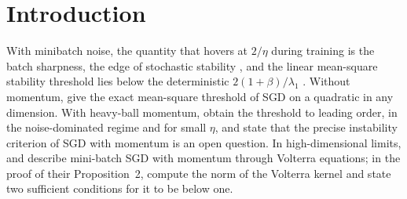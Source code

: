\documentclass[11pt]{article}
\theoremstyle{remark}
\begin{document}
\section{Introduction}

With minibatch noise, the quantity that hovers at $2/\eta$ during training is the batch sharpness, the edge of stochastic stability \citep{andreyev2024eoss}, and the linear mean-square stability threshold lies below the deterministic $2(1+\beta)/\lambda_1$ \citep{wu2018sgd,andreyev2026momentum}. Without momentum, \citet{mulayoff2024exact} give the exact mean-square threshold of SGD on a quadratic in any dimension. With heavy-ball momentum, \citet{andreyev2026momentum} obtain the threshold to leading order, in the noise-dominated regime and for small $\eta$, and state that the precise instability criterion of SGD with momentum is an open question. In high-dimensional limits, \citet{paquette2021momentum} and \citet{lee2022minibatch} describe mini-batch SGD with momentum through Volterra equations; in the proof of their Proposition~2, \citet{lee2022minibatch} compute the norm of the Volterra kernel and state two sufficient conditions for it to be below one.
\end{document}
